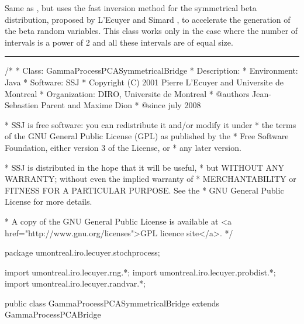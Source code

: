 
Same as , but uses the fast inversion method
for the symmetrical beta distribution, proposed by L'Ecuyer and Simard
\cite {rLEC06a}, to accelerate the generation of the beta random variables.
This class works only in the case where the number of intervals is a power of
2 and all these intervals are of equal size.

\bigskip\hrule\bigskip

\begin{code}
\begin{hide}
/*
 * Class:        GammaProcessPCASymmetricalBridge
 * Description:
 * Environment:  Java
 * Software:     SSJ
 * Copyright (C) 2001  Pierre L'Ecuyer and Universite de Montreal
 * Organization: DIRO, Universite de Montreal
 * @authors      Jean-Sebastien Parent and Maxime Dion
 * @since        july 2008

 * SSJ is free software: you can redistribute it and/or modify it under
 * the terms of the GNU General Public License (GPL) as published by the
 * Free Software Foundation, either version 3 of the License, or
 * any later version.

 * SSJ is distributed in the hope that it will be useful,
 * but WITHOUT ANY WARRANTY; without even the implied warranty of
 * MERCHANTABILITY or FITNESS FOR A PARTICULAR PURPOSE.  See the
 * GNU General Public License for more details.

 * A copy of the GNU General Public License is available at
   <a href="http://www.gnu.org/licenses">GPL licence site</a>.
 */
\end{hide}
package umontreal.iro.lecuyer.stochprocess;\begin{hide}
import umontreal.iro.lecuyer.rng.*;
import umontreal.iro.lecuyer.probdist.*;
import umontreal.iro.lecuyer.randvar.*;

\end{hide}

public class GammaProcessPCASymmetricalBridge extends GammaProcessPCABridge \begin{hide} {
\end{hide}
\end{code}
